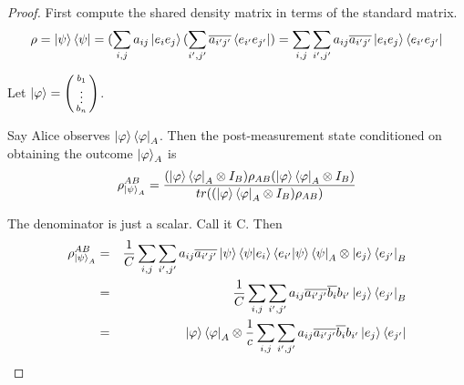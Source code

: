 \begin{proof}
First compute the shared density matrix in terms of the standard matrix.
\begin{equation}
\rho=\ket{\psi}\bra{\psi}=(\sum_{i,j} a_{ij}\ket{e_i e_j}(\sum_{i',j'} \overline{a_{i'j'}}\bra{e_{i'} e_{j'}})=\sum_{i,j} \sum_{i',j'} a_{ij} \overline{a_{i'j'}}\ket{e_i e_j}\bra{e_{i'} e_{j'}}   
\end{equation}

Let $\ket{\varphi}=\left(\begin{smallmatrix}b_1\\ \vdots \\b_n\end{smallmatrix}\right)$.

Say Alice observes $\ket{\varphi}\bra{\varphi}_A$.
Then the post-measurement state conditioned on obtaining the outcome $\ket{\varphi}_A$ is
\begin{equation}
\rho_{\ket{\psi}_A}^{AB}=\frac{(\ket{\varphi}\bra{\varphi}_A \otimes I_B)\rho_{AB}(\ket{\varphi}\bra{\varphi}_A \otimes I_B)}{tr((\ket{\varphi}\bra{\varphi}_A \otimes I_B)\rho_{AB})}
\end{equation}

The denominator is just a scalar. Call it C. Then 
\begin{eqnarray}
\rho_{\ket{\psi}_A}^{AB}&=&\frac{1}{C} \sum_{i,j} \sum_{{i'}, {j'}} a_{ij} \overline{a_{i'j'}}\ket{\psi}\braket{\psi|e_i}\braket{e_{i'}|\psi}\bra{\psi}_A \otimes \ket{e_j}\bra{e_{j'}}_B\\
&=&\frac{1}{C} \sum_{i,j} \sum_{{i'}, {j'}} a_{ij} \overline{a_{i'j'}}\overline{b_i}b_{i'}\ket{e_j}\bra{e_{j'}}_B\\
&=&\ket{\varphi}\bra{\varphi}_A \otimes \frac{1}{c} \sum_{i,j} \sum_{{i'}, {j'}} a_{ij} \overline{a_{i'j'}}\overline{b_i}b_{i'}\ket{e_j}\bra{e_{j'}}
\end{eqnarray}


\end{proof}
